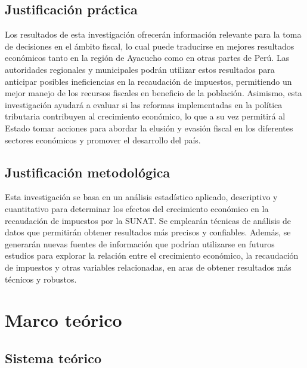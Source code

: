 \documentclass[
  letterpaper,
]{article}
\begin{document}
\hypertarget{justificaciuxf3n-pruxe1ctica}{%
\subsection{Justificación práctica}\label{justificaciuxf3n-pruxe1ctica}}

Los resultados de esta investigación ofrecerán información relevante
para la toma de decisiones en el ámbito fiscal, lo cual puede traducirse
en mejores resultados económicos tanto en la región de Ayacucho como en
otras partes de Perú. Las autoridades regionales y municipales podrán
utilizar estos resultados para anticipar posibles ineficiencias en la
recaudación de impuestos, permitiendo un mejor manejo de los recursos
fiscales en beneficio de la población. Asimismo, esta investigación
ayudará a evaluar si las reformas implementadas en la política
tributaria contribuyen al crecimiento económico, lo que a su vez
permitirá al Estado tomar acciones para abordar la elusión y evasión
fiscal en los diferentes sectores económicos y promover el desarrollo
del país.

\hypertarget{justificaciuxf3n-metodoluxf3gica}{%
\subsection{Justificación
metodológica}\label{justificaciuxf3n-metodoluxf3gica}}

Esta investigación se basa en un análisis estadístico aplicado,
descriptivo y cuantitativo para determinar los efectos del crecimiento
económico en la recaudación de impuestos por la SUNAT. Se emplearán
técnicas de análisis de datos que permitirán obtener resultados más
precisos y confiables. Además, se generarán nuevas fuentes de
información que podrían utilizarse en futuros estudios para explorar la
relación entre el crecimiento económico, la recaudación de impuestos y
otras variables relacionadas, en aras de obtener resultados más técnicos
y robustos.

\hypertarget{marco-teuxf3rico}{%
\section{Marco teórico}\label{marco-teuxf3rico}}

\hypertarget{sistema-teuxf3rico}{%
\subsection{Sistema teórico}\label{sistema-teuxf3rico}}
\end{document}
